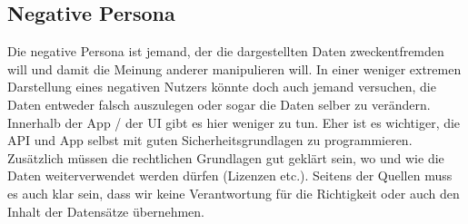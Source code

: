 \subsection{Negative Persona}
%
Die negative Persona ist jemand, der die dargestellten Daten zweckentfremden will und damit die Meinung anderer manipulieren will. In einer weniger extremen Darstellung
eines negativen Nutzers könnte doch auch jemand versuchen, die Daten entweder falsch auszulegen oder sogar die Daten selber zu verändern.
Innerhalb der App / der UI gibt es hier weniger zu tun. Eher ist es wichtiger, die API und App selbst mit guten Sicherheitsgrundlagen zu programmieren. 
Zusätzlich müssen die rechtlichen Grundlagen gut geklärt sein, wo und wie die Daten weiterverwendet werden dürfen (Lizenzen etc.).
Seitens der Quellen muss es auch klar sein, dass wir keine Verantwortung für die Richtigkeit oder auch den Inhalt der Datensätze übernehmen.